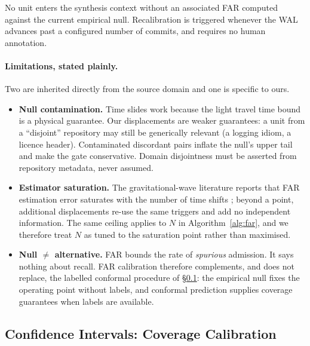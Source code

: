 \begin{invariant}
\label{inv:far}
No unit enters the synthesis context without an associated FAR computed against the current empirical null. Recalibration is triggered whenever the WAL advances past a configured number of commits, and requires no human annotation.
\end{invariant}

\paragraph{Limitations, stated plainly.} Two are inherited directly from the source domain and one is specific to ours.
\begin{itemize}
  \item \textbf{Null contamination.} Time slides work because the light travel time bound is a physical guarantee. Our displacements are weaker guarantees: a unit from a ``disjoint'' repository may still be generically relevant (a logging idiom, a licence header). Contaminated discordant pairs inflate the null's upper tail and make the gate conservative. Domain disjointness must be asserted from repository metadata, never assumed.
  \item \textbf{Estimator saturation.} The gravitational-wave literature reports that FAR estimation error saturates with the number of time shifts \citep{was2010timeslides}; beyond a point, additional displacements re-use the same triggers and add no independent information. The same ceiling applies to $N$ in Algorithm~\ref{alg:far}, and we therefore treat $N$ as tuned to the saturation point rather than maximised.
  \item \textbf{Null $\neq$ alternative.} FAR bounds the rate of \emph{spurious} admission. It says nothing about recall. FAR calibration therefore complements, and does not replace, the labelled conformal procedure of \S\ref{sec:retrieval:confidence}: the empirical null fixes the operating point without labels, and conformal prediction supplies coverage guarantees when labels are available.
\end{itemize}

\subsection{Confidence Intervals: Coverage Calibration}
\label{sec:retrieval:confidence}

